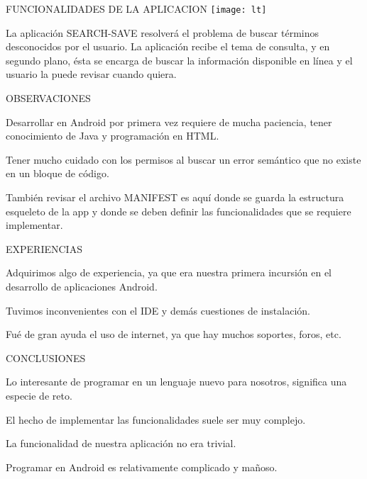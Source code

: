 \documentclass{beamer}
\begin{document}
	\begin{frame}{FUNCIONALIDADES DE LA APLICACION}
		\centering
  		\texttt{[image: lt]}
  		\begin{block}{}
		La aplicación SEARCH-SAVE resolverá el problema de buscar términos desconocidos por el usuario. La aplicación recibe el tema de consulta, y en segundo plano, ésta se encarga de buscar la información disponible en línea y el usuario la puede revisar cuando quiera.
  		\end{block}				
	\end{frame}
	
  	

\begin{frame}{OBSERVACIONES}
		\centering
  		\begin{block}{}
  		Desarrollar en Android por primera vez requiere de mucha paciencia, tener conocimiento de Java y programación en HTML.
		\end{block}
  		\begin{block}{}
		Tener mucho cuidado con los permisos al buscar un error semántico que no existe en un bloque de código.
  		\end{block}
		\centering
  		\begin{block}{}
  		También revisar el archivo MANIFEST es aquí donde se guarda la estructura esqueleto de la app y donde se deben definir las funcionalidades que se requiere implementar.
  		\end{block}
 	\end{frame}


\begin{frame}{EXPERIENCIAS}
		\centering
  		\begin{block}{}
  		Adquirimos algo de experiencia, ya que era nuestra primera incursión en el desarrollo de aplicaciones Android.
  		\end{block}
		\begin{block}{}
Tuvimos inconvenientes con el IDE y demás cuestiones de instalación.
  		\end{block}
		\begin{block}{}
Fué de gran ayuda el uso de internet, ya que hay muchos soportes, foros, etc.
  		\end{block}
 	\end{frame}

\begin{frame}{CONCLUSIONES}
		\centering
  		\begin{block}{}
		Lo interesante de programar en un lenguaje nuevo para nosotros, significa una especie de reto.
  		\end{block}
  		\begin{block}{}
		El hecho de implementar las funcionalidades suele ser muy complejo.
  		\end{block}
  		\begin{block}{}
		La funcionalidad de nuestra aplicación no era trivial.
  		\end{block}
  		\begin{block}{}
  		Programar en Android es relativamente complicado y mañoso.
  		\end{block}

 	\end{frame}
\end{document}
